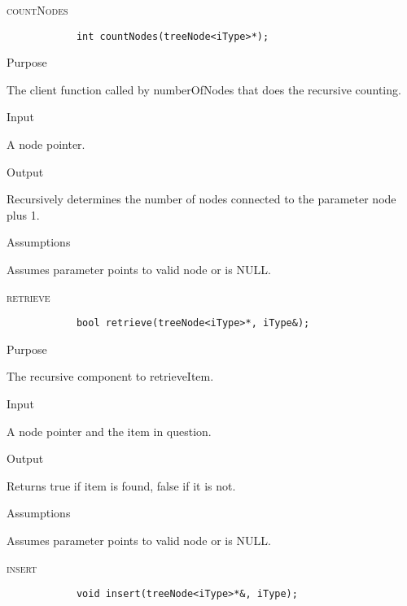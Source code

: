\documentclass[pdftex, 12pt]{article}
\begin{document}
\begin{description}
\begin{description}
		\end{description}
	\item{\textsc{countNodes}}
		\begin{lstlisting}
			int countNodes(treeNode<iType>*);
		\end{lstlisting}
		\begin{description}

			\item{Purpose}

				The client function called by numberOfNodes that does the recursive counting.

			\item{Input}

				A node pointer.

			\item{Output}

				Recursively determines the number of nodes connected to the parameter node plus 1.

			\item{Assumptions}

				Assumes parameter points to valid node or is NULL.

		\end{description}
	\item{\textsc{retrieve}}
		\begin{lstlisting}
			bool retrieve(treeNode<iType>*, iType&);
		\end{lstlisting}
		\begin{description}

			\item{Purpose}

				The recursive component to retrieveItem.

			\item{Input}

				A node pointer and the item in question.

			\item{Output}

				Returns true if item is found, false if it is not.

			\item{Assumptions}

				Assumes parameter points to valid node or is NULL.

		\end{description}
	\item{\textsc{insert}}
		\begin{lstlisting}
			void insert(treeNode<iType>*&, iType);
		\end{lstlisting}
		\begin{description}


\end{description}
\end{description}
\end{document}
